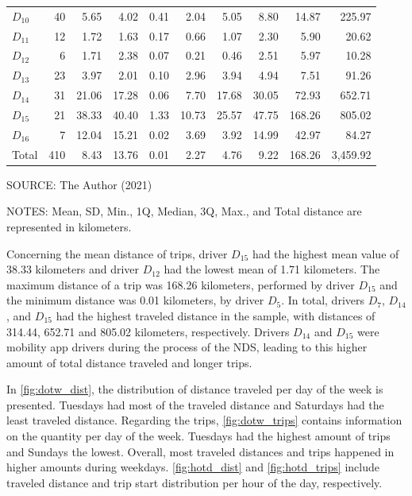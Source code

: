 \begin{table}[!htbp]
\begin{tabular}{lrrrrrrrrr}
        $D_{10}$ & 40 & 5.65 & 4.02 & 0.41 & 2.04 & 5.05 & 8.80 & 14.87 & 225.97 \\ 
        $D_{11}$ & 12 & 1.72 & 1.63 & 0.17 & 0.66 & 1.07 & 2.30 & 5.90 & 20.62 \\ 
        $D_{12}$ &  6 & 1.71 & 2.38 & 0.07 & 0.21 & 0.46 & 2.51 & 5.97 & 10.28 \\ 
        $D_{13}$ & 23 & 3.97 & 2.01 & 0.10 & 2.96 & 3.94 & 4.94 & 7.51 & 91.26 \\ 
        $D_{14}$ & 31 & 21.06 & 17.28 & 0.06 & 7.70 & 17.68 & 30.05 & 72.93 & 652.71 \\ 
        $D_{15}$ & 21 & 38.33 & 40.40 & 1.33 & 10.73 & 25.57 & 47.75 & 168.26 & 805.02 \\ 
        $D_{16}$ &  7 & 12.04 & 15.21 & 0.02 & 3.69 & 3.92 & 14.99 & 42.97 & 84.27 \\ 
        \hline
        Total & 410 & 8.43 & 13.76 & 0.01 & 2.27 & 4.76 & 9.22 & 168.26 & 3,459.92 \\
        \hline
    \end{tabular}
    \label{tab:trips}
    \par \vspace{2mm} \footnotesize \raggedright
    SOURCE: The Author (2021)
    \par \vspace{1mm} \footnotesize \raggedright
    NOTES: Mean, SD, Min., 1Q, Median, 3Q, Max., and Total distance are represented in kilometers. 
\end{table}

Concerning the mean distance of trips, driver $D_{15}$ had the highest mean value of 38.33 kilometers and driver $D_{12}$ had the lowest mean of 1.71 kilometers. The maximum distance of a trip was 168.26 kilometers, performed by driver $D_{15}$ and the minimum distance was 0.01 kilometers, by driver $D_5$. In total, drivers $D_7$, $D_{14}$, and $D_{15}$ had the highest traveled distance in the sample, with distances of 314.44, 652.71 and 805.02 kilometers, respectively. Drivers $D_{14}$ and $D_{15}$ were mobility app drivers during the process of the NDS, leading to this higher amount of total distance traveled and longer trips. 



In \autoref{fig:dotw_dist}, the distribution of distance traveled per day of the week is presented. Tuesdays had most of the traveled distance and Saturdays had the least traveled distance. Regarding the trips, \autoref{fig:dotw_trips} contains information on the quantity per day of the week. Tuesdays had the highest amount of trips and Sundays the lowest. Overall, most traveled distances and trips happened in higher amounts during weekdays. \autoref{fig:hotd_dist} and \autoref{fig:hotd_trips} include traveled distance and trip start distribution per hour of the day, respectively.  


